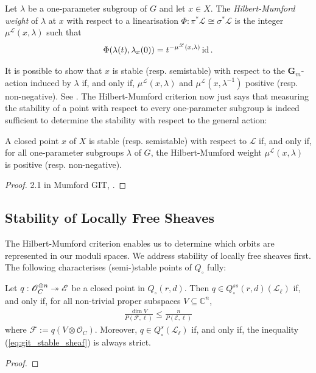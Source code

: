\documentclass[12pt]{ociamthesis}  %
\begin{document}
\begin{definition}
  Let $\lambda$ be a one-parameter subgroup of $G$ and let
  $x\in X$.  The \emph{Hilbert-Mumford weight} of $\lambda$
  at $x$ with respect to a linearisation
  $\Phi:\pi^*\mathscr L\cong\sigma^*\mathscr L$
  is the integer  $\mu^{\mathscr L}(x,\lambda)$
  such that 
  \begin{align*}
    \Phi(\lambda(t),\lambda_x(0))
    = t^{-\mu^{\mathscr L}(x,\lambda)}\operatorname{id}.
  \end{align*}
\end{definition}

It is possible to show that $x$ is stable (resp. semistable) with
respect to the $\mathbf G_m$-action induced by $\lambda$ if, and only
if, $\mu^{\mathscr L}(x,\lambda)$ and $\mu^{\mathscr L}(x,\lambda^{-1})$
positive (resp. non-negative).
See \cite[Lemma 6.9]{hoskins2016}.
The Hilbert-Mumford criterion now just says that measuring the
stability of a point with respect to every one-parameter subgroup
is indeed sufficient to determine the stability with respect to the
general action:

\begin{theorem}
  A closed point $x$ of $X$ is stable (resp. semistable) with
  respect to $\mathscr L$ if, and only if, for all one-parameter
  subgroups $\lambda$ of $G$, the Hilbert-Mumford weight
  $\mu^{\mathscr L}(x,\lambda)$ is positive (resp. non-negative).
  \begin{proof}
    2.1 in Mumford GIT, \cite[Theorem 4.9]{newstead1978}.
    \missingproof
  \end{proof}
\end{theorem}

\subsection{Stability of Locally Free Sheaves}

The Hilbert-Mumford criterion enables us to determine which orbits
are represented in our moduli spaces.
We address stability of locally free sheaves first.
The following characterises
(semi-)stable points of $Q_\circ$ fully:

\begin{theorem}
  Let $q : \mathscr O^{\oplus n}_C \twoheadrightarrow \mathscr E$ be a closed point
  in $Q_\circ(r,d)$. Then $q\in Q^{ss}_\circ(r,d)(\mathscr L_\ell)$
  if, and only if, for all non-trivial proper subspaces
  $V\subseteq \mathbb C^n$, 
  \begin{align}\label{eq:git_stable_sheaf}
    \frac{\dim V}{P(\mathscr F,\ell)}\leq\frac{n}{P(\mathscr E,\ell)}
  \end{align}
  where $\mathscr F := q(V\otimes\mathscr O_C)$. Moreover,
  $q\in Q^s_\circ(\mathscr L_\ell)$ if, and only if, the inequality
  (\ref{eq:git_stable_sheaf}) is always strict.
  \begin{proof}
    \missingproof
  \end{proof}
\end{theorem}
\end{document}
